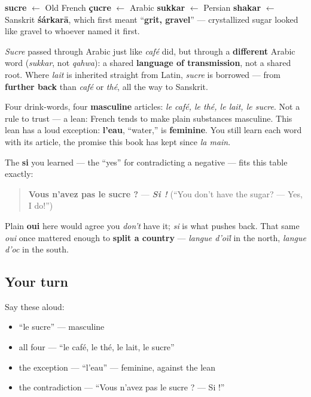 \begin{cousinweb}
\textbf{sucre} $\leftarrow$ Old French \textbf{çucre} $\leftarrow$ Arabic \textbf{sukkar} $\leftarrow$ Persian \textbf{shakar} $\leftarrow$ Sanskrit \textbf{śárkarā}, which first meant \textquotedblleft{}\textbf{grit, gravel}\textquotedblright{} — crystallized sugar looked like gravel to whoever named it first.

\emph{Sucre} passed through Arabic just like \emph{café} did, but through a \textbf{different} Arabic word (\emph{sukkar}, not \emph{qahwa}): a shared \textbf{language of transmission}, not a shared root. Where \emph{lait} is inherited straight from Latin, \emph{sucre} is borrowed — from \textbf{further back} than \emph{café} or \emph{thé}, all the way to Sanskrit.
\end{cousinweb}

\begin{grammarlens}[title={Grammar Lens: a lean, and its one loud exception}]
Four drink-words, four \textbf{masculine} articles: \emph{le café, le thé, le lait, le sucre}. Not a rule to trust — a lean: French tends to make plain substances masculine. This lean has a loud exception: \textbf{l'eau}, \textquotedblleft{}water,\textquotedblright{} is \textbf{feminine}. You still learn each word with its article, the promise this book has kept since \emph{la main}.
\end{grammarlens}

\begin{culture}
The \textbf{si} you learned — the \textquotedblleft{}yes\textquotedblright{} for contradicting a negative — fits this table exactly:

\begin{quote}
\textbf{Vous n'avez pas le sucre ?} — \emph{\textbf{Si !}} (\textquotedblleft{}You don't have the sugar? — Yes, I do!\textquotedblright{})
\end{quote}

Plain \textbf{oui} here would agree you \emph{don't} have it; \emph{si} is what pushes back. That same \emph{oui} once mattered enough to \textbf{split a country} — \emph{langue d'oïl} in the north, \emph{langue d'oc} in the south.
\end{culture}

\subsection*{Your turn}
Say these aloud:

\begin{itemize}
\raggedright
  \item \textquotedblleft{}le sucre\textquotedblright{} — masculine
  \item all four — \textquotedblleft{}le café, le thé, le lait, le sucre\textquotedblright{}
  \item the exception — \textquotedblleft{}l'eau\textquotedblright{} — feminine, against the lean
  \item the contradiction — \textquotedblleft{}Vous n'avez pas le sucre ? — Si !\textquotedblright{}
\end{itemize}

